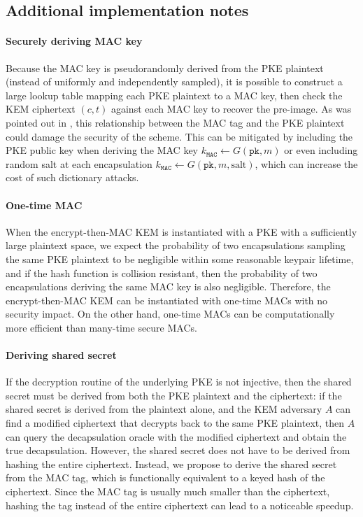 \documentclass[runningheads]{llncs}
\newcommand{\mac}{\texttt{MAC}}
\newcommand{\pk}{\texttt{pk}}
\begin{document}
\subsection{Additional implementation notes}\label{sec:additional-implementation-notes}
\paragraph{Securely deriving MAC key} Because the MAC key is pseudorandomly derived from the PKE plaintext (instead of uniformly and independently sampled), it is possible to construct a large lookup table mapping each PKE plaintext to a MAC key, then check the KEM ciphertext $(c, t)$ against each MAC key to recover the pre-image. As was pointed out in \cite{DBLP:journals/iacr/Bernstein21,cryptoeprint:2021/912}, this relationship between the MAC tag and the PKE plaintext could damage the security of the scheme. This can be mitigated by including the PKE public key when deriving the MAC key $k_\mac \leftarrow G(\pk, m)$ or even including random salt at each encapsulation $k_\mac \leftarrow G(\pk, m, \text{salt})$, which can increase the cost of such dictionary attacks.

\paragraph{One-time MAC} When the encrypt-then-MAC KEM is instantiated with a PKE with a sufficiently large plaintext space, we expect the probability of two encapsulations sampling the same PKE plaintext to be negligible within some reasonable keypair lifetime, and if the hash function is collision resistant, then the probability of two encapsulations deriving the same MAC key is also negligible. Therefore, the encrypt-then-MAC KEM can be instantiated with one-time MACs \cite{DBLP:journals/jcss/CarterW79} with no security impact. On the other hand, one-time MACs can be computationally more efficient than many-time secure MACs.

\paragraph{Deriving shared secret} If the decryption routine of the underlying PKE is not injective, then the shared secret must be derived from both the PKE plaintext and the ciphertext: if the shared secret is derived from the plaintext alone, and the KEM adversary $A$ can find a modified ciphertext that decrypts back to the same PKE plaintext, then $A$ can query the decapsulation oracle with the modified ciphertext and obtain the true decapsulation. However, the shared secret does not have to be derived from hashing the entire ciphertext. Instead, we propose to derive the shared secret from the MAC tag, which is functionally equivalent to a keyed hash of the ciphertext. Since the MAC tag is usually much smaller than the ciphertext, hashing the tag instead of the entire ciphertext can lead to a noticeable  speedup.
\end{document}
